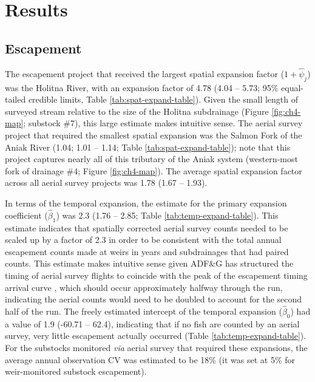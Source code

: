 \documentclass[12pt,]{book}
\theoremstyle{definition}
\theoremstyle{definition}
\theoremstyle{definition}
\theoremstyle{remark}
\begin{document}
\section{Results}\label{results-3}

\subsection{Escapement}\label{esc-data-results}

\noindent
The escapement project that received the largest spatial expansion
factor (\(1 + \hat{\psi}_j\)) was the Holitna River, with an expansion
factor of 4.78 (4.04 -- 5.73; 95\% equal-tailed credible limits, Table
\ref{tab:spat-expand-table}). Given the small length of surveyed stream
relative to the size of the Holitna subdrainage (Figure
\ref{fig:ch4-map}; substock \#7), this large estimate makes intuitive
sense. The aerial survey project that required the smallest spatial
expansion was the Salmon Fork of the Aniak River (1.04; 1.01 -- 1.14;
Table \ref{tab:spat-expand-table}); note that this project captures
nearly all of this tributary of the Aniak system (western-most fork of
drainage \#4; Figure \ref{fig:ch4-map}). The average spatial expansion
factor across all aerial survey projects was 1.78 (1.67 -- 1.93).

In terms of the temporal expansion, the estimate for the primary
expansion coefficient (\(\hat{\beta}_1\)) was 2.3 (1.76 -- 2.85; Table
\ref{tab:temp-expand-table}). This estimate indicates that spatially
corrected aerial survey counts needed to be scaled up by a factor of 2.3
in order to be consistent with the total annual escapement counts made
at weirs in years and subdrainages that had paired counts. This estimate
makes intuitive sense given ADF\&G has structured the timing of aerial
survey flights to coincide with the peak of the escapement timing
arrival curve \citep{head-smith-2018}, which should occur approximately
halfway through the run, indicating the aerial counts would need to be
doubled to account for the second half of the run. The freely estimated
intercept of the temporal expansion (\(\hat{\beta}_0\)) had a value of
1.9 (-60.71 -- 62.4), indicating that if no fish are counted by an
aerial survey, very little escapement actually occurred (Table
\ref{tab:temp-expand-table}). For the substocks monitored \emph{via}
aerial survey that required these expansions, the average annual
observation CV was estimated to be 18\% (it was set at 5\% for
weir-monitored substock escapement).
\end{document}
